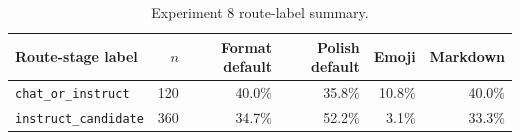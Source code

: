 \begin{table}[t]
\centering
\caption{Experiment 8 route-label summary.}
\label{tab:exp8-stage-summary}
\begin{tabular}{lrrrrr}
\toprule
Route-stage label & $n$ & Format default & Polish default & Emoji & Markdown \\
\midrule
\texttt{chat\_or\_instruct} & 120 & 40.0\% & 35.8\% & 10.8\% & 40.0\% \\
\texttt{instruct\_candidate} & 360 & 34.7\% & 52.2\% & 3.1\% & 33.3\% \\
\bottomrule
\end{tabular}
\end{table}
